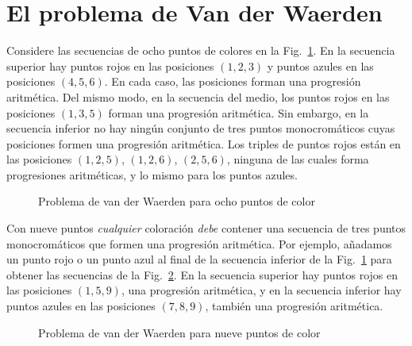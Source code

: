 
\section{El problema de Van der Waerden}\label{s.van}

Considere las secuencias de ocho puntos de colores en la Fig.~\ref{f.vdw1}. En la secuencia superior hay puntos rojos en las posiciones $(1,2,3)$ y puntos azules en las posiciones $(4,5,6)$. En cada caso, las posiciones forman una progresión aritmética. Del mismo modo, en la secuencia del medio, los puntos rojos en las posiciones $(1,3,5)$ forman una progresión aritmética. Sin embargo, en la secuencia inferior no hay ningún conjunto de tres puntos monocromáticos cuyas posiciones formen una progresión aritmética. 
Los triples de puntos rojos están en las posiciones $(1,2,5)$, $(1,2,6)$, $(2,5,6)$, ninguna de las cuales forma progresiones aritméticas, y lo mismo para los puntos azules.

\begin{figure}[htb]
\begin{center}
\end{center}
\caption{Problema de van der Waerden para ocho puntos de color}\label{f.vdw1}
\end{figure}

Con nueve puntos \emph{cualquier} coloración \emph{debe} contener una secuencia de tres puntos monocromáticos que formen una progresión aritmética. Por ejemplo, añadamos un punto rojo o un punto azul al final de la secuencia inferior de la Fig.~\ref{f.vdw1} para obtener las secuencias de la Fig.~\ref{f.vdw2}. En la secuencia superior hay puntos rojos en las posiciones $(1,5,9)$, una progresión aritmética, y en la secuencia inferior hay puntos azules en las posiciones $(7,8,9)$, también una progresión aritmética.
\begin{figure}[htb]
\begin{center}
\end{center}
\caption{Problema de van der Waerden para nueve puntos de color}\label{f.vdw2}
\end{figure}

